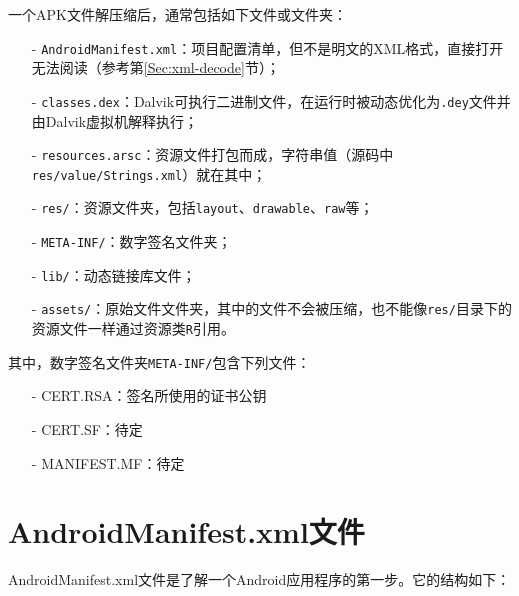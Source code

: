 一个APK文件解压缩后，通常包括如下文件或文件夹：
\begin{itemize}
  \item[-] \lstinline!AndroidManifest.xml!：项目配置清单，但不是明文的XML格式，直接打开无法阅读（参考第\ref{Sec:xml-decode}节）；
  \item[-] \lstinline!classes.dex!：Dalvik可执行二进制文件，在运行时被动态优化为\lstinline!.dey!文件并由Dalvik虚拟机解释执行；
  \item[-] \lstinline!resources.arsc!：资源文件打包而成，字符串值（源码中\lstinline!res/value/Strings.xml!）就在其中；
  \item[-] \lstinline!res/!：资源文件夹，包括\lstinline!layout!、\lstinline!drawable!、\lstinline!raw!等；
  \item[-] \lstinline!META-INF/!：数字签名文件夹；
  \item[-] \lstinline!lib/!：动态链接库文件；
  \item[-] \lstinline!assets/!：原始文件文件夹，其中的文件不会被压缩，也不能像\lstinline!res/!目录下的资源文件一样通过资源类\lstinline!R!引用。
\end{itemize}
其中，数字签名文件夹\lstinline!META-INF/!包含下列文件：
\begin{itemize}
  \item[-] CERT.RSA：签名所使用的证书公钥
  \item[-] CERT.SF：待定
  \item[-] MANIFEST.MF：待定
\end{itemize}

\section{AndroidManifest.xml文件}
AndroidManifest.xml\cite{url:android_manifest}文件是了解一个Android应用程序的第一步。它的结构如下：


